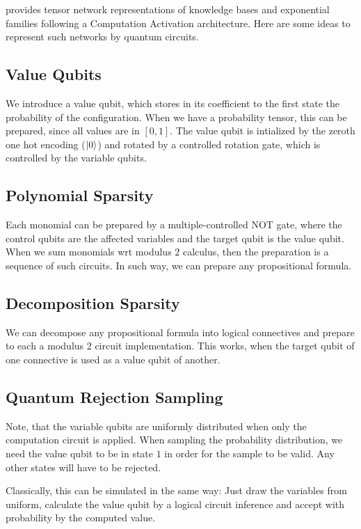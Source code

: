 \documentclass[aps,onecolumn,nofootinbib,pra]{article}
\begin{document}
    \tnreason provides tensor network representations of knowledge bases and exponential families following a Computation Activation architecture.
    Here are some ideas to represent such networks by quantum circuits.

    \subsection{Value Qubits}

    We introduce a value qubit, which stores in its coefficient to the first state the probability of the configuration.
    When we have a probability tensor, this can be prepared, since all values are in $[0,1]$.
    The value qubit is intialized by the zeroth one hot encoding ($\ket{0}$) and rotated by a controlled rotation gate, which is controlled by the variable qubits.

    \subsection{Polynomial Sparsity}

    Each monomial can be prepared by a multiple-controlled NOT gate, where the control qubits are the affected variables and the target qubit is the value qubit.
    When we sum monomials wrt modulus 2 calculus, then the preparation is a sequence of such circuits.
    In such way, we can prepare any propositional formula.

    \subsection{Decomposition Sparsity}

    We can decompose any propositional formula into logical connectives and prepare to each a modulus 2 circuit implementation.
    This works, when the target qubit of one connective is used as a value qubit of another.

    \subsection{Quantum Rejection Sampling}

    Note, that the variable qubits are uniformly distributed when only the computation circuit is applied.
    When sampling the probability distribution, we need the value qubit to be in state $1$ in order for the sample to be valid.
    Any other states will have to be rejected.

    Classically, this can be simulated in the same way: Just draw the variables from uniform, calculate the value qubit by a logical circuit inference and accept with probability by the computed value.
\end{document}
